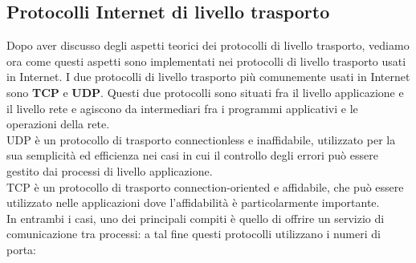 \documentclass[12pt]{report}
\begin{document}
	\subsection{Protocolli Internet di livello trasporto}
	Dopo aver discusso degli aspetti teorici dei protocolli di livello trasporto, vediamo ora come questi aspetti sono implementati nei protocolli di livello trasporto usati in Internet. I due protocolli di livello trasporto più comunemente usati in Internet sono \textbf{TCP} e \textbf{UDP}. Questi due protocolli sono situati fra il livello applicazione e il livello rete e agiscono da intermediari fra i programmi applicativi e le operazioni della rete.
	\vspace{\baselineskip}\\
	UDP è un protocollo di trasporto connectionless e inaffidabile, utilizzato per la sua semplicità ed efficienza nei casi in cui il controllo degli errori può essere gestito dai processi di livello applicazione.
	\vspace{\baselineskip}\\
	TCP è un protocollo di trasporto connection-oriented e affidabile, che può essere utilizzato nelle applicazioni dove l'affidabilità è particolarmente importante.
	\vspace{\baselineskip}\\
	In entrambi i casi, uno dei principali compiti è quello di offrire un servizio di comunicazione tra processi: a tal fine questi protocolli utilizzano i numeri di porta:
\end{document}
